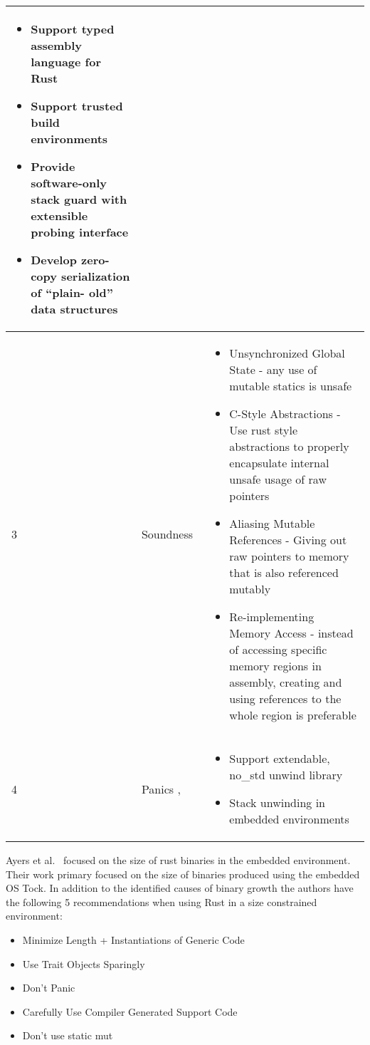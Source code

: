 \documentclass[sigconf]{acmart}
\begin{document}
\begin{table*}[htbp]
\begin{tabular}{p{1cm} p{5cm} p{10cm}}
\begin{itemize}
            \item Support typed assembly language for Rust
            \item Support trusted build environments 
            \item Provide software-only stack guard with extensible probing interface
            \item Develop zero-copy serialization of “plain- old” data structures
        \end{itemize}
        \\
        \hline
        3 & Soundness~\cite{Klimt2023-ob} &
        \begin{itemize}
            \item Unsynchronized Global State - any use of mutable statics is unsafe
            \item C-Style Abstractions - Use rust style abstractions to properly encapsulate internal unsafe usage of raw pointers
            \item Aliasing Mutable References - Giving out raw pointers to memory that is also referenced mutably
            \item Re-implementing Memory Access - instead of accessing specific memory regions in assembly, creating and using references to the whole region is preferable
        \end{itemize}
        \\
        \hline
        4 & Panics \cite{Ma2023-ef},\cite{Burtsev2021-mh} &
        \begin{itemize}
            \item Support extendable, no\_std unwind library
            \item Stack unwinding in embedded environments
        \end{itemize}
        \\
    \hline
  \end{tabular}
  \caption{Challenges Unique to the Rust Programming Language}
    \label{tab:RQ3}
\end{table*}

Ayers et al.~\cite{Ayers2022-sf} focused on the size of rust binaries in the embedded environment. Their work primary focused on the size of binaries produced using the embedded OS Tock. In addition to the identified causes of binary growth the authors have the following 5 recommendations when using Rust in a size constrained environment:
\begin{itemize}
  \item Minimize Length + Instantiations of Generic Code
  \item Use Trait Objects Sparingly
  \item Don't Panic
  \item Carefully Use Compiler Generated Support Code
  \item Don't use static mut
\end{itemize}
\end{document}
